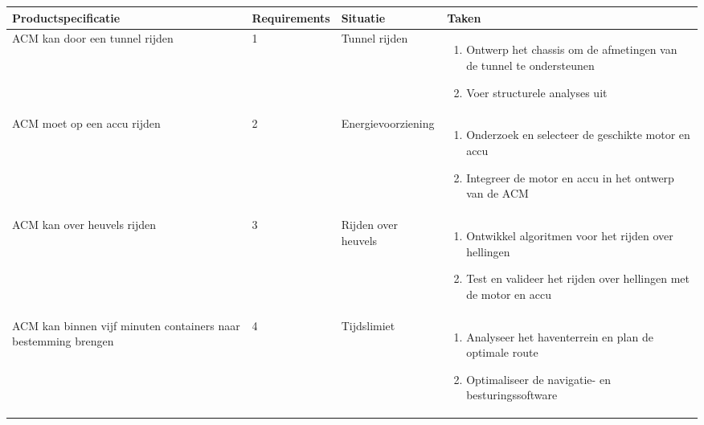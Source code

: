 \begin{longtable}{@{}p{4cm}p{2cm}p{3cm}p{5cm}@{}}
    \toprule
    Productspecificatie                                                                                    & Requirements & Situatie                      & Taken \\
    \midrule
    \endhead

    ACM kan door een tunnel rijden                                                                         & 1            & Tunnel rijden                 &
    \begin{enumerate}[nosep, leftmargin=*]
        \item Ontwerp het chassis om de afmetingen van de tunnel te ondersteunen
        \item Voer structurele analyses uit
    \end{enumerate}                                                                                       \\
    \midrule
    ACM moet op een accu rijden                                                                            & 2            & Energievoorziening            &
    \begin{enumerate}[nosep, leftmargin=*]
        \item Onderzoek en selecteer de geschikte motor en accu
        \item Integreer de motor en accu in het ontwerp van de ACM
    \end{enumerate}                                                                                                     \\
    \midrule

    ACM kan over heuvels rijden                                                                            & 3            & Rijden over heuvels           &
    \begin{enumerate}[nosep, leftmargin=*]
        \item Ontwikkel algoritmen voor het rijden over hellingen
        \item Test en valideer het rijden over hellingen met de motor en accu
    \end{enumerate}                                                                                          \\
    \midrule

    ACM kan binnen vijf minuten containers naar bestemming brengen                                         & 4            & Tijdslimiet                   &
    \begin{enumerate}[nosep, leftmargin=*]
        \item Analyseer het haventerrein en plan de optimale route
        \item Optimaliseer de navigatie- en besturingssoftware
    \end{enumerate}                                                                                                     \\
    \midrule


\end{longtable}
